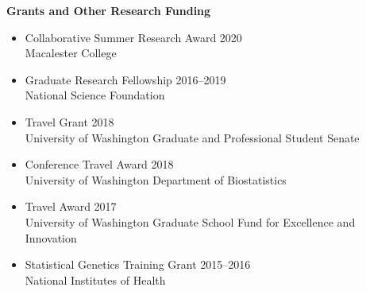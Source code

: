 \documentclass[margin]{res}
\begin{document}
\begin{resume}
\textbf{Grants and Other Research Funding}
\begin{itemize}
\item Collaborative Summer Research Award  \hfill 2020 \\ %
Macalester College
\item Graduate Research Fellowship \hfill 2016--2019 \\
National Science Foundation  
\item Travel Grant \hfill 2018 \\ University of Washington Graduate and Professional Student Senate
\item Conference Travel Award \hfill 2018 \\
University of Washington Department of Biostatistics
\item Travel Award \hfill 2017 \\
University of Washington Graduate School Fund for Excellence and Innovation
\item Statistical Genetics Training Grant \hfill 2015--2016  \\
National Institutes of Health %
\end{itemize}


\end{resume}
\end{document}
